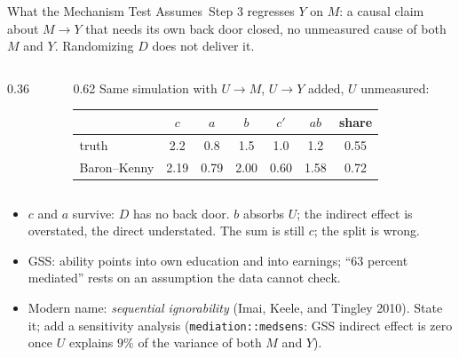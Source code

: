\documentclass[aspectratio=169,11pt,xcolor=dvipsnames]{beamer}
\newcommand{\srcp}[1]{{\scriptsize\color{gray}(#1)}}
\newcommand{\core}{\,\raisebox{0.6pt}{\textcolor{corestar}{$\bigstar$}}}
\begin{document}
\begin{frame}{What the Mechanism Test Assumes\core}
Step 3 regresses $Y$ on $M$: a causal claim about $M \to Y$ that needs
its own back door closed, \alert{no unmeasured cause of both $M$ and $Y$}.
Randomizing $D$ does not deliver it.
\begin{columns}[c]
\begin{column}{0.36\textwidth}
\centering
{}
\end{column}
\begin{column}{0.62\textwidth}
Same simulation with $U \to M$, $U \to Y$ added, $U$ unmeasured:
\begin{center}\small
\renewcommand{\arraystretch}{1.05}
\begin{tabular}{lcccccc}
\toprule
 & $c$ & $a$ & $b$ & $c'$ & $ab$ & share \\
\midrule
truth & 2.2 & 0.8 & 1.5 & 1.0 & 1.2 & 0.55 \\
Baron--Kenny & 2.19 & 0.79 & \alert{2.00} & \alert{0.60} & \alert{1.58} & \alert{0.72} \\
\bottomrule
\end{tabular}
\end{center}
\end{column}
\end{columns}
\begin{itemize}\itemsep1pt
  \item $c$ and $a$ survive: $D$ has no back door. $b$ absorbs $U$; the
        indirect effect is overstated, the direct understated. The sum is
        still $c$; the split is wrong.
  \item GSS: ability points into own education and into earnings; ``63
        percent mediated'' rests on an assumption the data cannot check.
  \item Modern name: \emph{sequential ignorability} \srcp{Imai, Keele, and
        Tingley 2010}. State it; add a sensitivity analysis
        (\texttt{mediation::medsens}: GSS indirect effect is zero once $U$
        explains $9\%$ of the variance of both $M$ and $Y$).
\end{itemize}
\end{frame}
\end{document}

